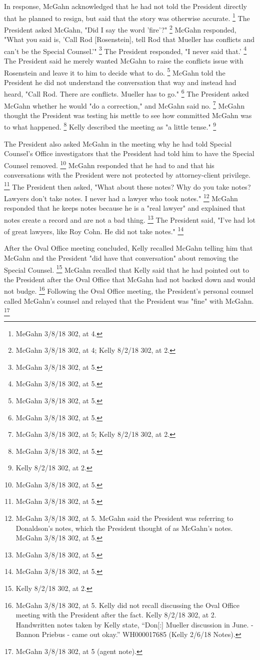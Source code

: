 {In response, McGahn acknowledged that he had not told the President directly that he planned to resign, but said that the story was otherwise accurate.%
\footnote{MeGahn 3/8/18 302, at 4.}
The President asked McGahn, "Did I say the word 'fire'?"%
\footnote{McGahn 3/8/18 302, at 4; Kelly 8/2/18 302, at 2.}
McGahn responded, "What you said is, 'Call Rod [Rosenstein], tell Rod that Mueller has conflicts and can't be the Special Counsel.'"%
\footnote{McGahn 3/8/18 302, at 5.}
The President responded, "I never said that.'%
\footnote{McGahn 3/8/18 302, at 5.}
The President said he merely wanted McGahn to raise the conflicts issue with Rosenstein and leave it to him to decide what to do.%
\footnote{McGahn 3/8/18 302, at 5.}
McGahn told the President he did not understand the conversation that way and instead had heard, "Call Rod.
There are conflicts.
Mueller has to go."%
\footnote{McGahn 3/8/18 302, at 5.}
The President asked McGahn whether he would "do a correction," and McGahn said no.%
\footnote{McGahn 3/8/18 302, at 5; Kelly 8/2/18 302, at 2.}
McGahn thought the President was testing his mettle to see how committed McGahn was to what happened.%
\footnote{McGahn 3/8/18 302, at 5.}
Kelly described the meeting as "a little tense."%
\footnote{Kelly 8/2/18 302, at 2.}

The President also asked McGahn in the meeting why he had told Special Counsel's Office investigators that the President had told him to have the Special Counsel removed.%
\footnote{McGahn 3/8/18 302, at 5.}
McGahn responded that he had to and that his conversations with the President were not protected by attorney-client privilege.%
\footnote{McGahn 3/8/18 302, at 5.}
The President then asked, "What about these notes? Why do you take notes? Lawyers don't take notes.
I never had a lawyer who took notes."%
\footnote{McGahn 3/8/18 302, at 5.
McGahn said the President was referring to Donaldson’s notes, which the President thought of as McGahn’s notes.
McGahn 3/8/18 302, at 5.}
McGahn responded that he keeps notes because he is a "real lawyer" and explained that notes create a record and are not a bad thing.%
\footnote{McGahn 3/8/18 302, at 5.}
The President said, "I've had lot of great lawyers, like Roy Cohn.
He did not take notes."%
\footnote{McGahn 3/8/18 302, at 5.}

After the Oval Office meeting concluded, Kelly recalled McGahn telling him that McGahn and the President "did have that conversation" about removing the Special Counsel.%
\footnote{Kelly 8/2/18 302, at 2.}
McGahn recalled that Kelly said that he had pointed out to the President after the Oval Office that McGahn had not backed down and would not budge.%
\footnote{McGahn 3/8/18 302, at 5.
Kelly did not recall discussing the Oval Office meeting with the President after the fact.
Kelly 8/2/18 302, at 2.
Handwritten notes taken by Kelly state, “Don[:] Mueller discussion in June. - Bannon Priebus - came out okay.”
WH000017685 (Kelly 2/6/18 Notes).}
Following the Oval Office meeting, the President's personal counsel called McGahn's counsel and relayed that the President was "fine" with McGahn.%
\footnote{McGahn 3/8/18 302, at 5 (agent note).}

}
